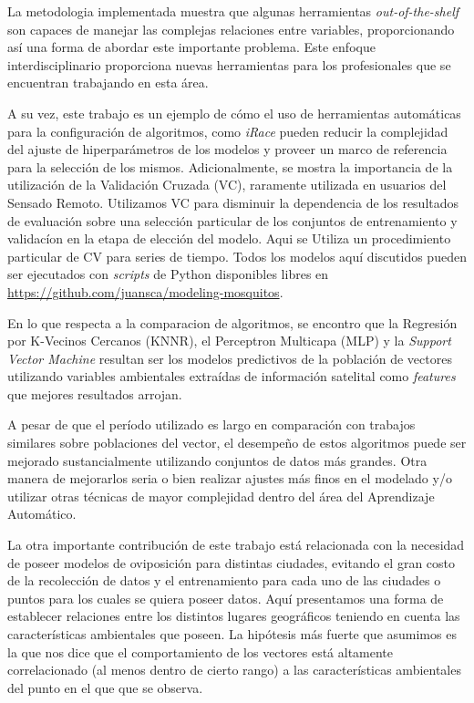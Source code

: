   \par La metodologia implementada muestra que algunas herramientas \textit{out-of-the-shelf}
    son capaces de manejar las complejas relaciones entre variables, proporcionando
    así una forma de abordar este importante problema. Este enfoque interdisciplinario
    proporciona nuevas herramientas para los profesionales que se encuentran
    trabajando en esta área.

  \par A su vez, este trabajo es un ejemplo de cómo el uso de herramientas
    automáticas para la configuración de algoritmos, como \textit{iRace} pueden
    reducir la complejidad del ajuste de hiperparámetros de los modelos y
    proveer un marco de referencia para la selección de los mismos.
    Adicionalmente, se mostra la importancia de la utilización de la Validación
    Cruzada (VC), raramente utilizada en usuarios del Sensado Remoto.
    Utilizamos VC para disminuir la dependencia de los resultados de evaluación
    sobre una selección particular de los conjuntos de entrenamiento y validacíon
    en la etapa de elección del modelo. Aqui se Utiliza
    un procedimiento particular de CV para series de tiempo. Todos los modelos
    aquí discutidos pueden ser ejecutados con \textit{scripts} de Python
    disponibles libres en \url{https://github.com/juansca/modeling-mosquitos}.

  \par En lo que respecta a la comparacion de algoritmos, se encontro que la Regresión
  por K-Vecinos Cercanos (KNNR), el
    Perceptron Multicapa (MLP) y la \textit{Support Vector Machine} resultan ser los
     modelos predictivos de la población de vectores utilizando
    variables ambientales extraídas de información satelital como \textit{features}
    que mejores resultados arrojan.


    A pesar de que el período utilizado es largo en comparación con trabajos similares
    sobre poblaciones del vector, el desempeño de estos algoritmos puede ser
    mejorado sustancialmente utilizando
    conjuntos de datos más grandes. Otra manera de mejorarlos seria o bien
    realizar ajustes más finos en el modelado
    y/o utilizar otras técnicas de mayor complejidad dentro del área del Aprendizaje Automático.

  \par La otra importante contribución de este trabajo está relacionada con la
    necesidad de poseer modelos de oviposición para distintas ciudades, evitando
    el gran costo de la recolección de datos y el entrenamiento para cada uno de
    las ciudades o puntos para los cuales se quiera poseer datos. Aquí presentamos
    una forma de establecer relaciones entre los distintos lugares geográficos teniendo
    en cuenta las características ambientales que poseen. La hipótesis más fuerte que
    asumimos es la que nos dice que el comportamiento de los vectores está altamente
    correlacionado (al menos dentro de cierto rango) a las características ambientales
    del punto en el que que se observa.

